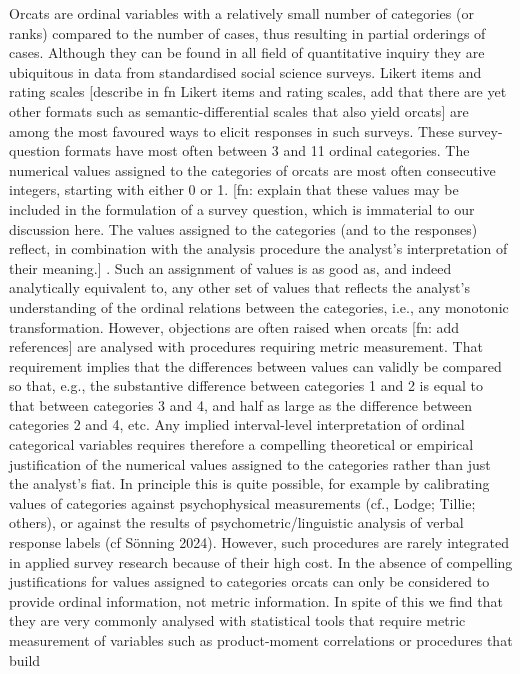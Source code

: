 \documentclass[
  12pt,
]{article}
\theoremstyle{plain}
\theoremstyle{definition}
\theoremstyle{remark}
\begin{document}
Orcats are ordinal variables with a relatively small number of
categories (or ranks) compared to the number of cases, thus resulting in
partial orderings of cases. Although they can be found in all field of
quantitative inquiry they are ubiquitous in data from standardised
social science surveys. Likert items and rating scales {[}describe in fn
Likert items and rating scales, add that there are yet other formats
such as semantic-differential scales that also yield orcats{]} are among
the most favoured ways to elicit responses in such surveys. These
survey-question formats have most often between 3 and 11 ordinal
categories. The numerical values assigned to the categories of orcats
are most often consecutive integers, starting with either 0 or 1. {[}fn:
explain that these values may be included in the formulation of a survey
question, which is immaterial to our discussion here. The values
assigned to the categories (and to the responses) reflect, in
combination with the analysis procedure the analyst's interpretation of
their meaning.{]} . Such an assignment of values is as good as, and
indeed analytically equivalent to, any other set of values that reflects
the analyst's understanding of the ordinal relations between the
categories, i.e., any monotonic transformation. However, objections are
often raised when orcats {[}fn: add references{]} are analysed with
procedures requiring metric measurement. That requirement implies that
the differences between values can validly be compared so that, e.g.,
the substantive difference between categories 1 and 2 is equal to that
between categories 3 and 4, and half as large as the difference between
categories 2 and 4, etc. Any implied interval-level interpretation of
ordinal categorical variables requires therefore a compelling
theoretical or empirical justification of the numerical values assigned
to the categories rather than just the analyst's fiat. In principle this
is quite possible, for example by calibrating values of categories
against psychophysical measurements (cf., Lodge; Tillie; others), or
against the results of psychometric/linguistic analysis of verbal
response labels (cf Sönning 2024). However, such procedures are rarely
integrated in applied survey research because of their high cost. In the
absence of compelling justifications for values assigned to categories
orcats can only be considered to provide ordinal information, not metric
information. In spite of this we find that they are very commonly
analysed with statistical tools that require metric measurement of
variables such as product-moment correlations or procedures that build
\end{document}
